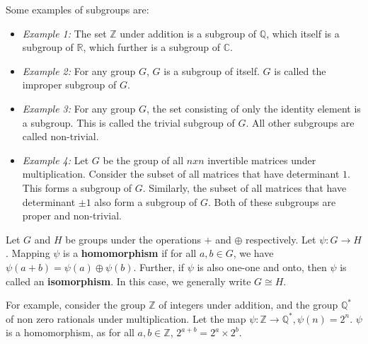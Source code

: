 Some examples of subgroups are:
\begin{itemize}
  \item \emph{Example 1:} The set $\mathbb{Z}$ under addition is a subgroup of $\mathbb{Q}$, which itself is a subgroup of $\mathbb{R}$, which further is a subgroup of $\mathbb{C}$.
  \item \emph{Example 2:} For any group $G$, $G$ is a subgroup of itself.
    $G$ is called the improper subgroup of $G$.
  \item \emph{Example 3:} For any group $G$, the set consisting of only the identity element is a subgroup.
    This is called the trivial subgroup of $G$.
    All other subgroups are called non-trivial.
  \item \emph{Example 4:} Let $G$ be the group of all $nxn$ invertible matrices under multiplication.
    Consider the subset of all matrices that have determinant $1$.
    This forms a subgroup of $G$.
    Similarly, the subset of all matrices that have determinant $\pm 1$ also form a subgroup of $G$.
    Both of these subgroups are proper and non-trivial.
\end{itemize}

\begin{definition} \label{def:homomorphism}
  Let $G$ and $H$ be groups under the operations $+$ and $\oplus$ respectively.
  Let $\psi: G \rightarrow H$. Mapping $\psi$ is a \textbf{homomorphism} if for all $a, b \in G$, we have $\psi(a + b) = \psi(a) \oplus \psi(b)$.
  Further, if $\psi$ is also one-one and onto, then $\psi$ is called an \textbf{isomorphism}.
  In this case, we generally write $G \cong H$.
\end{definition}
For example, consider the group $\mathbb{Z}$ of integers under addition, and the group $\mathbb{Q}^{*}$ of non zero rationals under multiplication.
Let the map $\psi: \mathbb{Z} \rightarrow \mathbb{Q}^{*}, \psi(n) = 2^{n}$.
$\psi$ is a homomorphism, as for all $a, b \in \mathbb{Z}$, $2^{a+b} = 2^{a} \times 2^{b}$.
